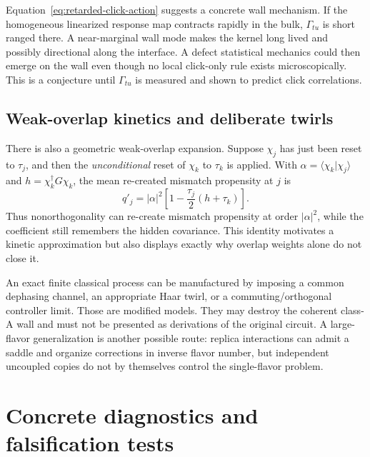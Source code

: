 \documentclass[
  aps,prx,twocolumn,superscriptaddress,longbibliography,
  nofootinbib,floatfix
]{revtex4-2}
\theoremstyle{plain}
\theoremstyle{definition}
\begin{document}
Equation~\eqref{eq:retarded-click-action} suggests a concrete wall mechanism.
If the homogeneous linearized response map contracts rapidly in the bulk,
\(\Gamma_{tu}\) is short ranged there.  A near-marginal wall mode makes the
kernel long lived and possibly directional along the interface.  A defect
statistical mechanics could then emerge on the wall even though no local
click-only rule exists microscopically.  This is a conjecture until
\(\Gamma_{tu}\) is measured and shown to predict click correlations.

\subsection{Weak-overlap kinetics and deliberate twirls}

There is also a geometric weak-overlap expansion.  Suppose \(\chi_j\) has just
been reset to \(\tau_j\), and then the \emph{unconditional} reset of
\(\chi_k\) to \(\tau_k\) is applied.  With
\(\alpha=\langle\chi_k|\chi_j\rangle\) and
\(h=\chi_k^\dagger G\chi_k\), the mean re-created mismatch propensity at
\(j\) is
\begin{equation}
 q'_j
 =|\alpha|^2\left[1-\frac{\tau_j}{2}(h+\tau_k)\right].
 \label{eq:recontamination-rate}
\end{equation}
Thus nonorthogonality can re-create mismatch propensity at order
\(|\alpha|^2\), while the
coefficient still remembers the hidden covariance.  This identity motivates a
kinetic approximation but also displays exactly why overlap weights alone do
not close it.

An exact finite classical process can be manufactured by imposing a common
dephasing channel, an appropriate Haar twirl, or a commuting/orthogonal
controller limit.  Those are modified models.  They may destroy the coherent
class-A wall and must not be presented as derivations of the original circuit.
A large-flavor generalization is another possible route: replica interactions
can admit a saddle and organize corrections in inverse flavor number, but
independent uncoupled copies do not by themselves control the single-flavor
problem.

\section{Concrete diagnostics and falsification tests}
\label{sec:tests}
\end{document}
